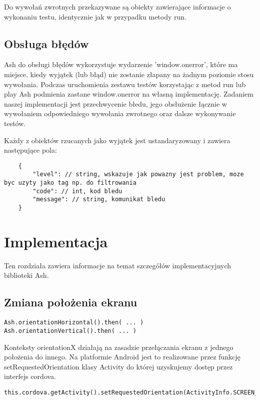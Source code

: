 \documentclass[brudnopis]{xmgr}
\begin{document}
Do wywołań zwrotnych przekazywane są obiekty zawierające informacje o wykonaniu testu, identycznie jak w przypadku metody run.

\section{Obsługa błędów}

Ash do obsługi błędów wykorzystuje wydarzenie 'window.onerror', które ma miejsce, kiedy wyjątek (lub błąd) nie zostanie złapany na żadnym poziomie stosu wywołania. Podczas uruchomienia zestawu testów korzystając z metod run lub play Ash podmienia zastane window.onerror na własną implementację. Zadaniem naszej implementacji jest przechwycenie błedu, jego obsłużenie łącznie w wywołaniem odpowiedniego wywołania zwrotnego oraz dalsze wykonywanie testów.

Każdy z obiektów rzucanych jako wyjątek jest ustandaryzowany i zawiera następujące pola: 

\begin{lstlisting}
	{
		"level": // string, wskazuje jak powazny jest problem, moze byc uzyty jako tag np. do filtrowania 
		"code": // int, kod bledu
		"message": // string, komunikat bledu 
	}
\end{lstlisting}

\chapter{Implementacja}

Ten rozdziała zawiera informacje na temat szczegółów implementacyjnych biblioteki Ash.

\section{Zmiana położenia ekranu}

\begin{lstlisting}
Ash.orientationHorizontal().then( ... ) 
Ash.orientationVertical().then( ... ) 
\end{lstlisting}

Konteksty orientationX działają na zasadzie przełączania ekranu z jednego położenia do innego.  Na platformie Android jest to realizowane przez funkcję setRequestedOrientation klasy Activity do której uzyskujemy dostęp przez interfejs cordova. 

\begin{lstlisting}
this.cordova.getActivity().setRequestedOrientation(ActivityInfo.SCREEN_ORIENTATION_LANDSCAPE);
\end{lstlisting}
\end{document}
